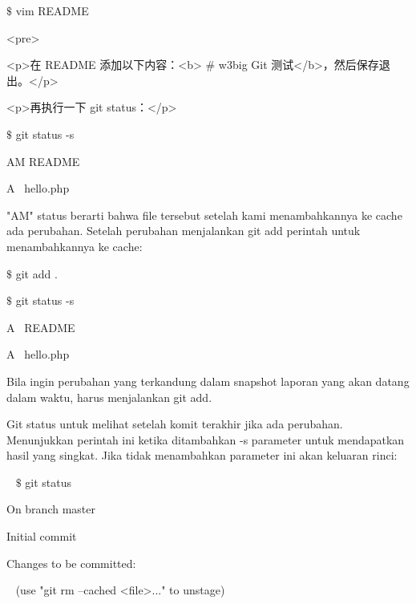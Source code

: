 \noindent 
{\fontsize{10pt}{10pt}\selectfont  $  \$  $ vim README} \par
\noindent 
{\fontsize{10pt}{10pt}\selectfont <pre>} \par
\noindent 
{\fontsize{10pt}{10pt}\selectfont <p>在 README 添加以下内容：<b> $  \#  $ w3big Git 测试</b>，然后保存退出。</p>} \par
\noindent 
{\fontsize{10pt}{10pt}\selectfont <p>再执行一下 git status：</p>} \par
\noindent 
{\fontsize{10pt}{10pt}\selectfont  $  \$  $ git status -s} \par
\noindent 
{\fontsize{10pt}{10pt}\selectfont AM README} \par
\noindent 
{\fontsize{10pt}{10pt}\selectfont A~ hello.php} \par
\vspace{12pt}
"AM" status berarti bahwa file tersebut setelah kami menambahkannya ke cache ada perubahan. Setelah perubahan menjalankan git add perintah untuk menambahkannya ke cache: \par
\noindent 
{\fontsize{10pt}{10pt}\selectfont  $  \$  $ git add .} \par
\noindent 
{\fontsize{10pt}{10pt}\selectfont  $  \$  $ git status -s} \par
\noindent 
{\fontsize{10pt}{10pt}\selectfont A~ README} \par
\noindent 
{\fontsize{10pt}{10pt}\selectfont A~ hello.php} \par
Bila ingin perubahan yang terkandung dalam snapshot laporan yang akan datang dalam waktu, harus menjalankan git add. \par
Git status untuk melihat setelah komit terakhir jika ada perubahan. Menunjukkan perintah ini ketika ditambahkan -s parameter untuk mendapatkan hasil yang singkat. Jika  tidak menambahkan parameter ini akan keluaran rinci:  \par
\noindent 
~  $  \$  $ git status \par
\noindent 
{\fontsize{10pt}{10pt}\selectfont On branch master} \par
\noindent 
\vspace{10pt}
\noindent 
{\fontsize{10pt}{10pt}\selectfont Initial commit} \par
\noindent 
\vspace{10pt}
\noindent 
{\fontsize{10pt}{10pt}\selectfont Changes to be committed:} \par
\noindent 
{\fontsize{10pt}{10pt}\selectfont ~ (use "git rm --cached <file>..." to unstage)} \par
